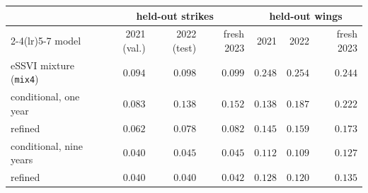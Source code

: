 \begin{tabular}{lrrrrrr}
\toprule
& \multicolumn{3}{c}{held-out strikes} & \multicolumn{3}{c}{held-out wings} \\
\cmidrule(lr){2-4}\cmidrule(lr){5-7}
model & 2021 (val.) & 2022 (test) & fresh 2023 & 2021 & 2022 & fresh 2023 \\
\midrule
eSSVI mixture (\texttt{mix4}) & $0.094$ & $0.098$ & $0.099$ & $0.248$ & $0.254$ & $0.244$ \\
conditional, one year & $0.083$ & $0.138$ & $0.152$ & $0.138$ & $0.187$ & $0.222$ \\
\quad refined & $0.062$ & $0.078$ & $0.082$ & $0.145$ & $0.159$ & $0.173$ \\
conditional, nine years & $0.040$ & $0.045$ & $0.045$ & $\mathbf{0.112}$ & $\mathbf{0.109}$ & $\mathbf{0.127}$ \\
\quad refined & $\mathbf{0.040}$ & $\mathbf{0.040}$ & $\mathbf{0.042}$ & $0.128$ & $0.120$ & $0.135$ \\
\bottomrule
\end{tabular}
